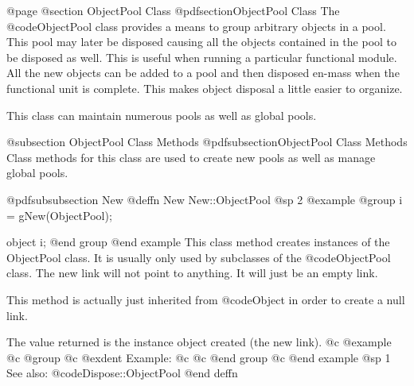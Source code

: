 
@page
@section ObjectPool Class
@pdfsection{ObjectPool Class}
The @code{ObjectPool} class provides a means to group arbitrary objects in a pool.
This pool may later be disposed causing all the objects contained in the pool to
be disposed as well.  This is useful when running a particular functional module.
All the new objects can be added to a pool and then disposed en-mass when the functional
unit is complete.  This makes object disposal a little easier to organize.

This class can maintain numerous pools as well as global pools.

@subsection ObjectPool Class Methods
@pdfsubsection{ObjectPool Class Methods}
Class methods for this class are used to create new pools as well as manage global pools.





@pdfsubsubsection {New}
@deffn {New} New::ObjectPool
@sp 2
@example
@group
i = gNew(ObjectPool);

object  i;
@end group
@end example
This class method creates instances of the ObjectPool class.  It is usually
only used by subclasses of the @code{ObjectPool} class.  The new link
will not point to anything.  It will just be an empty link.

This method is actually just inherited from @code{Object} in order
to create a null link.

The value returned is the instance object created (the new link).
@c @example
@c @group
@c @exdent Example:
@c 
@c @end group
@c @end example
@sp 1
See also:  @code{Dispose::ObjectPool}
@end deffn

